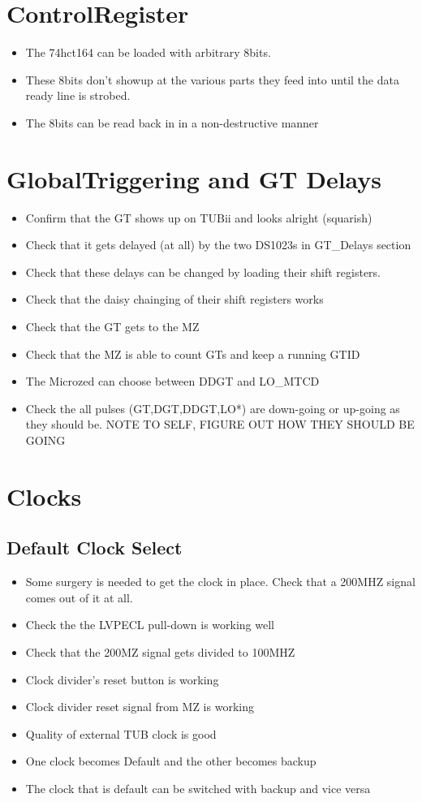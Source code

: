 \documentclass[11pt,a4paper]{article}
\begin{document}
\section {ControlRegister}
\begin{itemize}
\item The 74hct164 can be loaded with arbitrary 8bits.
\item These 8bits don't showup at the  various parts they feed into until the data
ready line is strobed.
\item The 8bits can be read back in in a non-destructive manner
\end{itemize}
\section{GlobalTriggering and GT Delays}
\begin{itemize}
\item Confirm that the GT shows up on TUBii and looks alright (squarish)
\item Check that it gets delayed (at all) by the two DS1023s in GT\_Delays section
\item Check that these delays can be changed by loading their shift registers.
\item Check that the daisy chainging of their shift registers works
\item Check that the GT gets to the MZ
\item Check that the MZ is able to count GTs and keep a running GTID
\item The Microzed can choose between DDGT and LO\_MTCD
\item Check the all pulses (GT,DGT,DDGT,LO*) are down-going or up-going as they 
should be. NOTE TO SELF, FIGURE OUT HOW THEY SHOULD BE GOING
\end{itemize}
\section{Clocks}
\subsection{Default Clock Select}
\begin{itemize}
\item Some surgery is needed to get the clock in place. Check that a 200MHZ signal comes out of it at all.
\item Check the the LVPECL pull-down is working well
\item Check that the 200MZ signal gets divided to 100MHZ
\item Clock divider's reset button is working
\item Clock divider reset signal from MZ is working
\item Quality of external TUB clock is good
\item One clock becomes Default and the other becomes backup
\item The clock that is default can be switched with backup and vice versa
\end{itemize}
\end{document}
